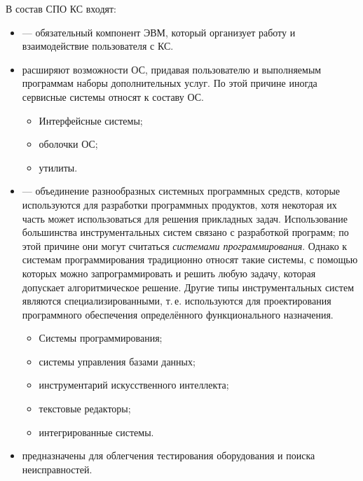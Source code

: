 \documentclass[a4paper, 10pt, notitlepage, pdftex,headsepline]{scrartcl}
\begin{document}
  В состав СПО КС входят:
  \begin{itemize}
    \item {} --- обязательный компонент ЭВМ, который
      организует работу и взаимодействие пользователя с КС.
    \item {} расширяют возможности ОС, придавая
      пользователю и выполняемым программам наборы дополнительных услуг.
      По этой причине иногда сервисные системы относят к составу ОС.
      \begin{itemize}
        \item Интерфейсные системы;
        \item оболочки ОС;
        \item утилиты.
      \end{itemize}
    \item {} --- объединение разнообразных
      системных программных средств, которые используются для разработки
      программных продуктов, хотя некоторая их часть может
      использоваться для решения прикладных задач.
      Использование большинства инструментальных систем связано с
      разработкой программ; по этой причине они могут считаться
      \textit{системами программирования}.
      Однако к системам программирования традиционно относят такие
      системы, с помощью которых можно запрограммировать и решить любую
      задачу, которая допускает алгоритмическое решение.
      Другие типы инструментальных систем являются специализированными,
      т.\,е. используются для проектирования программного обеспечения
      определённого функционального назначения.
      \begin{itemize}
        \item Системы программирования;
        \item системы управления базами данных;
        \item инструментарий искусственного интеллекта;
        \item текстовые редакторы;
        \item интегрированные системы.
      \end{itemize}
    \item {} предназначены для
      облегчения тестирования оборудования и поиска неисправностей.
  \end{itemize}
\end{document}
